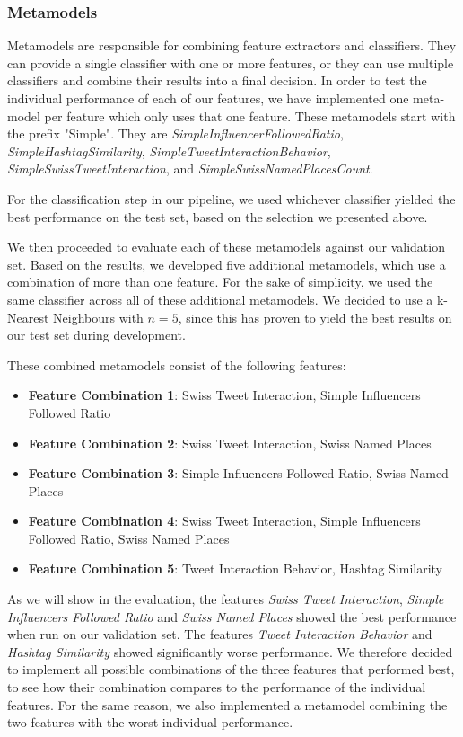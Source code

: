 \documentclass[10pt,a4paper]{article}
\begin{document}
\subsubsection{Metamodels}
Metamodels are responsible for combining feature extractors and classifiers. They can provide a single classifier with one or more features, or they can use multiple classifiers and combine their results into a final decision. In order to test the individual performance of each of our features, we have implemented one meta-model per feature which only uses that one feature. These metamodels start with the prefix "Simple". They are \textit{SimpleInfluencerFollowedRatio}, \textit{SimpleHashtagSimilarity}, \textit{SimpleTweetInteractionBehavior}, \textit{SimpleSwissTweetInteraction}, and \textit{SimpleSwissNamedPlacesCount}. 

For the classification step in our pipeline, we used whichever classifier yielded the best performance on the test set, based on the selection we presented above.

We then proceeded to evaluate each of these metamodels against our validation set. Based on the results, we developed five additional metamodels, which use a combination of more than one feature. For the sake of simplicity, we used the same classifier across all of these additional metamodels. We decided to use a k-Nearest Neighbours with $n=5$, since this has proven to yield the best results on our test set during development.

These combined metamodels consist of the following features:

\begin{itemize}
\item \textbf{Feature Combination 1}: Swiss Tweet Interaction, Simple Influencers Followed Ratio
\item \textbf{Feature Combination 2}: Swiss Tweet Interaction, Swiss Named Places
\item \textbf{Feature Combination 3}: Simple Influencers Followed Ratio, Swiss Named Places
\item \textbf{Feature Combination 4}: Swiss Tweet Interaction, Simple Influencers Followed Ratio, Swiss Named Places
\item \textbf{Feature Combination 5}: Tweet Interaction Behavior, Hashtag Similarity
\end{itemize}

As we will show in the evaluation, the features \textit{Swiss Tweet Interaction}, \textit{Simple Influencers Followed Ratio} and \textit{Swiss Named Places} showed the best performance when run on our validation set. The features \textit{Tweet Interaction Behavior} and \textit{Hashtag Similarity} showed significantly worse performance. We therefore decided to implement all possible combinations of the three features that performed best, to see how their combination compares to the performance of the individual features. For the same reason, we also implemented a metamodel combining the two features with the worst individual performance.
\end{document}
